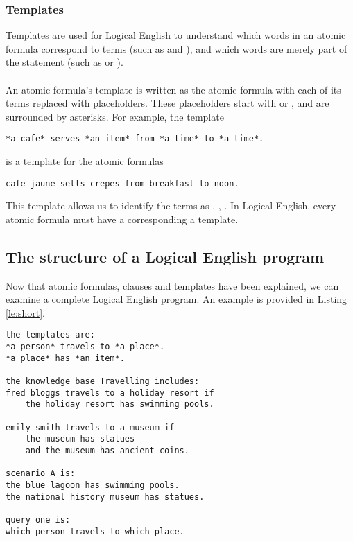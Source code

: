 \documentclass[../main.tex]{subfiles}
\begin{document}
\subsubsection{Templates}
Templates are used for Logical English to understand which words in an atomic formula correspond to terms (such as  and ), and which words are merely part of the statement (such as  or ). 
\\
\\
An atomic formula's template is written as the atomic formula with each of its terms replaced with placeholders. These placeholders start with  or , and are surrounded by asterisks. For example, the template
\begin{lstlisting}[language={LE},caption={A template in Logical English},label={le:template}]
    *a cafe* serves *an item* from *a time* to *a time*.
\end{lstlisting}
is a template for the atomic formulas
\begin{lstlisting}[language={LE}]
    cafe jaune sells crepes from breakfast to noon.
\end{lstlisting}
This template allows us to identify the terms as , , . In Logical English, every atomic formula must have a corresponding a template.

\subsection{The structure of a Logical English program}
Now that atomic formulas, clauses and templates have been explained, we can examine a complete Logical English program. An example is provided in Listing \ref{le:short}.
\begin{lstlisting}[language={LE},caption={A short Logical English program.},label={le:short}]
the templates are:
*a person* travels to *a place*.
*a place* has *an item*.

the knowledge base Travelling includes:
fred bloggs travels to a holiday resort if 
    the holiday resort has swimming pools.

emily smith travels to a museum if
    the museum has statues 
    and the museum has ancient coins.

scenario A is:
the blue lagoon has swimming pools.
the national history museum has statues.

query one is:
which person travels to which place.
\end{lstlisting}
\end{document}
